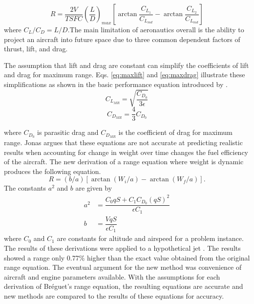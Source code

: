 \begin{equation}
\label{eqDragPolar}
    R = \dfrac{2V}{TSFC}\left(\dfrac{L}{D}\right)_{max}\left[\arctan\dfrac{C_{L_1}}{C_{L_{md}}}-\arctan\dfrac{C_{L_2}}{C_{L_{md}}}\right]
\end{equation}
where $C_L/C_D = L/D$.The main limitation of aeronautics overall is the ability to project an aircraft into future space due to three common dependent factors of thrust, lift, and drag.\par
The assumption that lift and drag are constant can simplify the coefficients of lift and drag for maximum range. Eqs. \ref{eq:maxlift} and \ref{eq:maxdrag} illustrate these simplifications as shown in the basic performance equation introduced by \cite{OptimizeBreguet}.
\begin{equation}
C_{L_{MR}} = \sqrt{\dfrac{C_{D_0}}{3\epsilon}}
\label{eq:maxlift}
\end{equation}
\begin{equation}
C_{D_{MR}} = \dfrac{4}{3}C_{D_0}
\label{eq:maxdrag}
\end{equation}
\par
where $C_{D_0}$ is parasitic drag and $C_{D_{MR}}$ is the coefficient of drag for maximum range. Jonas \cite{Jonas} argues that these equations are not accurate at predicting realistic results when accounting for change in weight over time changes the fuel efficiency of the aircraft. The new derivation of a range equation where weight is dynamic produces the following equation.
\begin{equation}
    R = (b/a)[\arctan(W_i/a)-\arctan(W_f/a)].
    \label{eq:dynamicrange}
\end{equation}
The constants $a^2$ and $b$ are given by 
\begin{equation}
    \begin{aligned}
        a^2 &= \dfrac{C_0qS+C_1C_{D_0}(qS)^2}{\epsilon C_1}\\
        b &= \dfrac{VqS}{\epsilon C_1}
    \end{aligned}
\end{equation}
where $C_0$ and $C_1$ are constants for altitude and airspeed for a problem instance. The results of these derivations were applied to a hypothetical jet \cite{Jonas}. The results showed a range only 0.77\% higher than the exact value obtained from the original range equation. The eventual argument for the new method was convenience of aircraft and engine parameters available. With the assumptions for each derivation of Br\'eguet's range equation, the resulting equations are accurate and new methods are compared to the results of these equations for accuracy.\par
